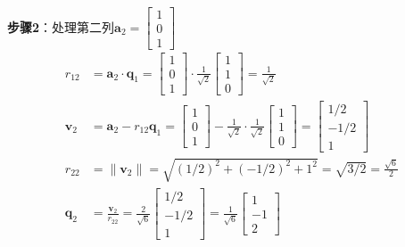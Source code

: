 \documentclass[12pt,a4paper]{article}
\begin{document}
\textbf{步骤2}：处理第二列$\bm{a}_2 = \begin{bmatrix} 1 \\ 0 \\ 1 \end{bmatrix}$
\begin{align}
r_{12} &= \bm{a}_2 \cdot \bm{q}_1 = \begin{bmatrix} 1 \\ 0 \\ 1 \end{bmatrix} \cdot \frac{1}{\sqrt{2}} \begin{bmatrix} 1 \\ 1 \\ 0 \end{bmatrix} = \frac{1}{\sqrt{2}} \\
\bm{v}_2 &= \bm{a}_2 - r_{12} \bm{q}_1 = \begin{bmatrix} 1 \\ 0 \\ 1 \end{bmatrix} - \frac{1}{\sqrt{2}} \cdot \frac{1}{\sqrt{2}} \begin{bmatrix} 1 \\ 1 \\ 0 \end{bmatrix} = \begin{bmatrix} 1/2 \\ -1/2 \\ 1 \end{bmatrix} \\
r_{22} &= \|\bm{v}_2\| = \sqrt{(1/2)^2 + (-1/2)^2 + 1^2} = \sqrt{3/2} = \frac{\sqrt{6}}{2} \\
\bm{q}_2 &= \frac{\bm{v}_2}{r_{22}} = \frac{2}{\sqrt{6}} \begin{bmatrix} 1/2 \\ -1/2 \\ 1 \end{bmatrix} = \frac{1}{\sqrt{6}} \begin{bmatrix} 1 \\ -1 \\ 2 \end{bmatrix}
\end{align}
\end{document}
